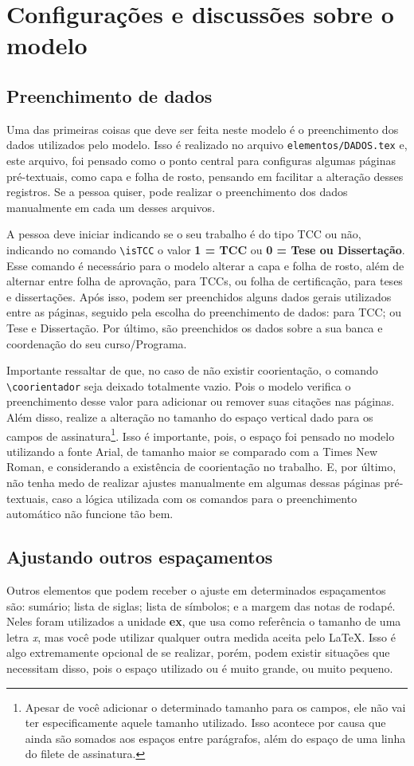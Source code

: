 \chapter{Configurações e discussões sobre o modelo}\label{capitulo:configuracao}
\section{Preenchimento de dados}
Uma das primeiras coisas que deve ser feita neste modelo é o preenchimento dos dados utilizados pelo modelo. Isso é realizado no arquivo \texttt{elementos/DADOS.tex} e, este arquivo, foi pensado como o ponto central para configuras algumas páginas pré-textuais, como capa e folha de rosto, pensando em facilitar a alteração desses registros. Se a pessoa quiser, pode realizar o preenchimento dos dados manualmente em cada um desses arquivos.

A pessoa deve iniciar indicando se o seu trabalho é do tipo TCC ou não, indicando no comando \verb|\isTCC| o valor \textbf{1 = TCC} ou \textbf{0 = Tese ou Dissertação}. Esse comando é necessário para o modelo alterar a capa e folha de rosto, além de alternar entre folha de aprovação, para TCCs, ou folha de certificação, para teses e dissertações. Após isso, podem ser preenchidos alguns dados gerais utilizados entre as páginas, seguido pela escolha do preenchimento de dados: para TCC; ou Tese e Dissertação. Por último, são preenchidos os dados sobre a sua banca e coordenação do seu curso/Programa.

Importante ressaltar de que, no caso de não existir coorientação, o comando \verb|\coorientador| seja deixado totalmente vazio. Pois o modelo verifica o preenchimento desse valor para adicionar ou remover suas citações nas páginas. Além disso, realize a alteração no tamanho do espaço vertical dado para os campos de assinatura\footnote{Apesar de você adicionar o determinado tamanho para os campos, ele não vai ter especificamente aquele tamanho utilizado. Isso acontece por causa que ainda são somados aos espaços entre parágrafos, além do espaço de uma linha do filete de assinatura.}. Isso é importante, pois, o espaço foi pensado no modelo utilizando a fonte Arial, de tamanho maior se comparado com a Times New Roman, e considerando a existência de coorientação no trabalho. E, por último, não tenha medo de realizar ajustes manualmente em algumas dessas páginas pré-textuais, caso a lógica utilizada com os comandos para o preenchimento automático não funcione tão bem.

\section{Ajustando outros espaçamentos}
Outros elementos que podem receber o ajuste em determinados espaçamentos são: sumário; lista de siglas; lista de símbolos; e a margem das notas de rodapé. Neles foram utilizados a unidade \textbf{ex}, que usa como referência o tamanho de uma letra \textit{x}, mas você pode utilizar qualquer outra medida aceita pelo \LaTeX. Isso é algo extremamente opcional de se realizar, porém, podem existir situações que necessitam disso, pois o espaço utilizado ou é muito grande, ou muito pequeno.

